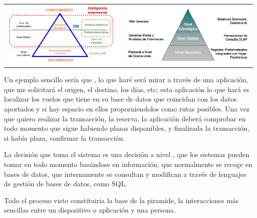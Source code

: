 \begin{center}
    \begin{tabular}{ c c }
        \includegraphics[scale=.8]{images/mod01-07.png} &
        \includegraphics[scale=.5]{images/mod01-07_1.png}
    \end{tabular}
    
\end{center}

Un ejemplo sencillo sería que , lo que haré será mirar a través de una aplicación, que me solicitará el origen, el destino, los días, etc; esta aplicación lo que hará es localizar los vuelos que tiene en su base de datos que coincidan con los datos aportados y si hay espacio en ellos proporniendolos como rutas posibles. Una vez que quiero realizar la transacción, la reserva, la aplicación deberá comprobar en todo momento que sigue habiendo plazas disponibles, y finalizada la transacción, si había plaza, confirmar la transacción.

La decisión que toma el sistema  es una decisión a nivel , que los sistemas pueden tomar en todo momento basándose en información, que normalmente se recoge en bases de datos, que internamente se consultan y modifican a través de lenguajes de gestión de bases de datos, como SQL. 

Todo el proceso visto constituiria la base de la piramide, la interacciones más sencillas entre un dispositivo o aplicación y una persona.

